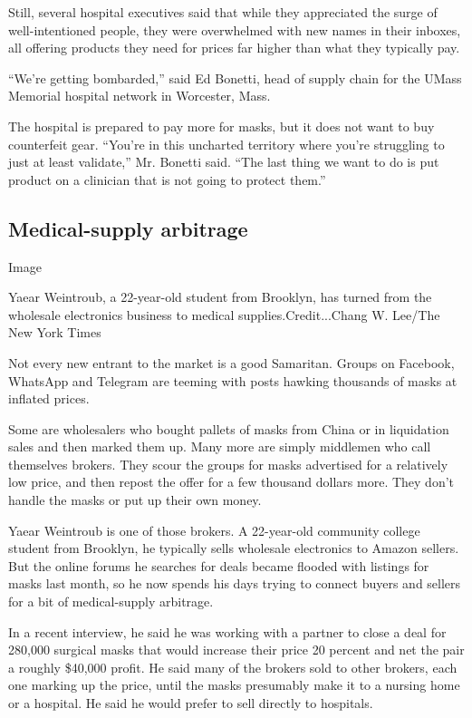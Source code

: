 Still, several hospital executives said that while they appreciated the
surge of well-intentioned people, they were overwhelmed with new names
in their inboxes, all offering products they need for prices far higher
than what they typically pay.

``We're getting bombarded,'' said Ed Bonetti, head of supply chain for
the UMass Memorial hospital network in Worcester, Mass.

The hospital is prepared to pay more for masks, but it does not want to
buy counterfeit gear. ``You're in this uncharted territory where you're
struggling to just at least validate,'' Mr. Bonetti said. ``The last
thing we want to do is put product on a clinician that is not going to
protect them.''

\hypertarget{medical-supply-arbitrage}{%
\subsection{Medical-supply arbitrage}\label{medical-supply-arbitrage}}

Image

Yaear Weintroub, a 22-year-old student from Brooklyn, has turned from
the wholesale electronics business to medical supplies.Credit...Chang W.
Lee/The New York Times

Not every new entrant to the market is a good Samaritan. Groups on
Facebook, WhatsApp and Telegram are teeming with posts hawking thousands
of masks at inflated prices.

Some are wholesalers who bought pallets of masks from China or in
liquidation sales and then marked them up. Many more are simply
middlemen who call themselves brokers. They scour the groups for masks
advertised for a relatively low price, and then repost the offer for a
few thousand dollars more. They don't handle the masks or put up their
own money.

Yaear Weintroub is one of those brokers. A 22-year-old community college
student from Brooklyn, he typically sells wholesale electronics to
Amazon sellers. But the online forums he searches for deals became
flooded with listings for masks last month, so he now spends his days
trying to connect buyers and sellers for a bit of medical-supply
arbitrage.

In a recent interview, he said he was working with a partner to close a
deal for 280,000 surgical masks that would increase their price 20
percent and net the pair a roughly \$40,000 profit. He said many of the
brokers sold to other brokers, each one marking up the price, until the
masks presumably make it to a nursing home or a hospital. He said he
would prefer to sell directly to hospitals.

